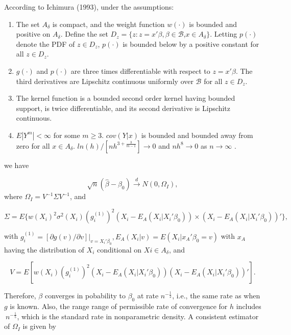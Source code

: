 \documentclass[a4paper]{article}
\begin{document}
\begin{theorem}
According to Ichimura (1993), under the assumptions:

\begin{enumerate}[label=(\roman*)]
	\item The set $A_\delta$ is compact, and the weight function $w(\cdot)$ is bounded and positive on $A_\delta$. Define the set $D_z = \{ z : z = x'\beta, \beta \in \mathcal{B}$,$ x \in A_\delta\}$. Letting $p(\cdot)$ denote the PDF of $z \in D_z$, $p(\cdot)$ is bounded below by a positive constant for all $z \in D_z$.
	\item $g(\cdot)$ and $p(\cdot)$ are three times differentiable with respect to $z = x'\beta$. The third derivatives are Lipschitz continuous uniformly over $\mathcal{B}$ for all $z \in D_z$.
	\item The kernel function is a bounded second order kernel having bounded support, is twice differentiable, and its second derivative is Lipschitz continuous.
	\item $E|Y^m| < \infty$ for some $m \geq 3$. $cov(Y|x)$ is bounded and bounded away from zero for all $x \in A_\delta$. $ln(h)/[nh^{3 + \frac{3}{m-1}}] \rightarrow 0$ and $nh^8 \rightarrow 0$ as $n \rightarrow \infty $ .
	
\end{enumerate}

we have

\[ \sqrt{n}(\hat{\beta} - \beta_0) \stackrel{d}{\rightarrow} N(0,\Omega_I), \] where $\Omega_I = V^{-1}\Sigma V^{-1}$, and

\[\Sigma = E\{w(X_i)^2\sigma^2(X_i)(g_i^{(1)})^2(X_i - E_A(X_i|X_i'\beta_0)) \times (X_i - E_A(X_i|X_i'\beta_0))'\},\]

with $g_i^{(1)} = [\partial g(v)/\partial v]|_{v = X_i'\beta_0}, E_A(X_i|v) = E(X_i|x_A'\beta_0 = v)$ with $x_A$ having the distribution of $X_i$ conditional on $Xi \in A_\delta$, and

\[ V = E[w(X_i)(g_i^{(1)})^2(X_i - E_A(X_i|X_i'\beta_0))(X_i - E_A(X_i|X_i'\beta_0))'].\]

\end{theorem}

Therefore, $\beta$ converges in pobability to $\beta_0$ at rate $n^{-\frac{1}{2}}$, i.e., the same rate as when $g$ is known. Also, the range range of permissible rate of convergence for $h$ includes $~n^{-\frac{1}{5}}$, which is the standard rate in nonparametric density.
A consistent estimator of $\Omega_I$ is given by
\end{document}
